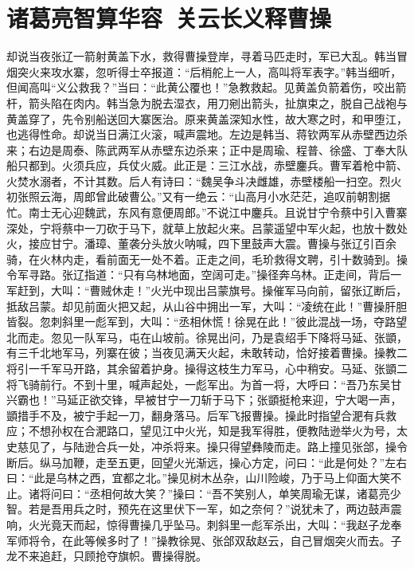\chapter{诸葛亮智算华容~关云长义释曹操}

却说当夜张辽一箭射黄盖下水，救得曹操登岸，寻着马匹走时，军已大乱。韩当冒烟突火来攻水寨，忽听得士卒报道：“后梢舵上一人，高叫将军表字。”韩当细听，但闻高叫“义公救我？”当曰：“此黄公覆也！”急教救起。见黄盖负箭着伤，咬出箭杆，箭头陷在肉内。韩当急为脱去湿衣，用刀剜出箭头，扯旗束之，脱自己战袍与黄盖穿了，先令别船送回大寨医治。原来黄盖深知水性，故大寒之时，和甲堕江，也逃得性命。却说当日满江火滚，喊声震地。左边是韩当、蒋钦两军从赤壁西边杀来；右边是周泰、陈武两军从赤壁东边杀来；正中是周瑜、程普、徐盛、丁奉大队船只都到。火须兵应，兵仗火威。此正是：三江水战，赤壁鏖兵。曹军着枪中箭、火焚水溺者，不计其数。后人有诗曰：“魏吴争斗决雌雄，赤壁楼船一扫空。烈火初张照云海，周郎曾此破曹公。”又有一绝云：“山高月小水茫茫，追叹前朝割据忙。南士无心迎魏武，东风有意便周郎。”不说江中鏖兵。且说甘宁令蔡中引入曹寨深处，宁将蔡中一刀砍于马下，就草上放起火来。吕蒙遥望中军火起，也放十数处火，接应甘宁。潘璋、董袭分头放火呐喊，四下里鼓声大震。曹操与张辽引百余骑，在火林内走，看前面无一处不着。正走之间，毛玠救得文聘，引十数骑到。操令军寻路。张辽指道：“只有乌林地面，空阔可走。”操径奔乌林。正走间，背后一军赶到，大叫：“曹贼休走！”火光中现出吕蒙旗号。操催军马向前，留张辽断后，抵敌吕蒙。却见前面火把又起，从山谷中拥出一军，大叫：“凌统在此！”曹操肝胆皆裂。忽刺斜里一彪军到，大叫：“丞相休慌！徐晃在此！”彼此混战一场，夺路望北而走。忽见一队军马，屯在山坡前。徐晃出问，乃是袁绍手下降将马延、张顗，有三千北地军马，列寨在彼；当夜见满天火起，未敢转动，恰好接着曹操。操教二将引一千军马开路，其余留着护身。操得这枝生力军马，心中稍安。马延、张顗二将飞骑前行。不到十里，喊声起处，一彪军出。为首一将，大呼曰：“吾乃东吴甘兴霸也！”马延正欲交锋，早被甘宁一刀斩于马下；张顗挺枪来迎，宁大喝一声，顗措手不及，被宁手起一刀，翻身落马。后军飞报曹操。操此时指望合淝有兵救应；不想孙权在合淝路口，望见江中火光，知是我军得胜，便教陆逊举火为号，太史慈见了，与陆逊合兵一处，冲杀将来。操只得望彝陵而走。路上撞见张郃，操令断后。纵马加鞭，走至五更，回望火光渐远，操心方定，问曰：“此是何处？”左右曰：“此是乌林之西，宜都之北。”操见树木丛杂，山川险峻，乃于马上仰面大笑不止。诸将问曰：“丞相何故大笑？”操曰：“吾不笑别人，单笑周瑜无谋，诸葛亮少智。若是吾用兵之时，预先在这里伏下一军，如之奈何？”说犹未了，两边鼓声震响，火光竟天而起，惊得曹操几乎坠马。刺斜里一彪军杀出，大叫：“我赵子龙奉军师将令，在此等候多时了！”操教徐晃、张郃双敌赵云，自己冒烟突火而去。子龙不来追赶，只顾抢夺旗帜。曹操得脱。

